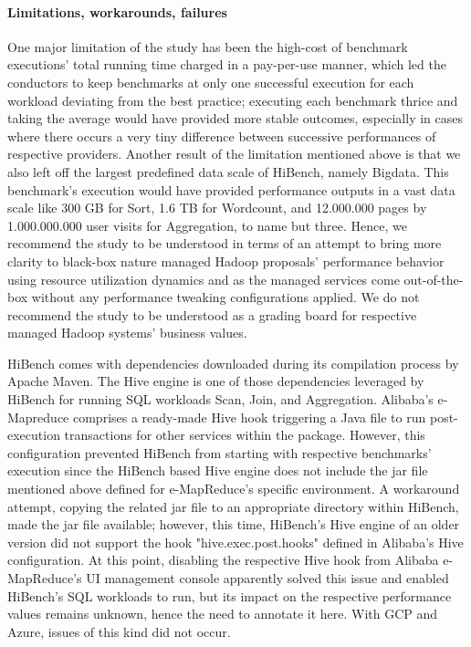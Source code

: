 \documentclass[review]{elsarticle}
\begin{document}
\paragraph{Limitations, workarounds, failures}One major limitation of the study has been the high-cost of benchmark executions' total running time charged in a pay-per-use manner, which led the conductors to keep benchmarks at only one successful execution for each workload deviating from the best practice; executing each benchmark thrice and taking the average would have provided more stable outcomes, especially in cases where there occurs a very tiny difference between successive performances of respective providers. Another result of the  limitation mentioned above is that we also left off the largest predefined data scale of HiBench, namely Bigdata. This benchmark's execution would have provided performance outputs in a vast data scale like 300 GB for Sort, 1.6 TB for Wordcount, and 12.000.000 pages by 1.000.000.000 user visits for Aggregation, to name but three. Hence, we recommend the study to be understood in terms of an attempt to bring more clarity to black-box nature managed Hadoop proposals' performance behavior using resource utilization dynamics and as the managed services come out-of-the-box without any performance tweaking configurations applied. We do not recommend the study to be understood as a grading board for respective managed Hadoop systems' business values.

HiBench comes with dependencies downloaded during its compilation process by Apache Maven. The Hive engine is one of those dependencies leveraged by HiBench for running SQL workloads Scan, Join, and Aggregation. Alibaba's e-Mapreduce comprises a ready-made Hive hook triggering a Java file to run post-execution transactions for other services within the package. However, this configuration prevented HiBench from starting with respective benchmarks' execution since the HiBench based Hive engine does not include the jar file mentioned above defined for e-MapReduce's specific environment. A workaround attempt, copying the related jar file to an appropriate directory within HiBench, made the jar file available; however, this time, HiBench's Hive engine of an older version did not support the hook "hive.exec.post.hooks" defined in Alibaba's Hive configuration. At this point, disabling the respective Hive hook from Alibaba e-MapReduce's UI management console apparently solved this issue and enabled HiBench's SQL workloads to run, but its impact on the respective performance values remains unknown, hence the need to annotate it here. With GCP and Azure, issues of this kind did not occur.
\end{document}
